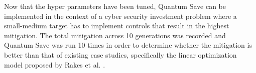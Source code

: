 \subsection*{\color{SubSectionBlue}{Cybersecurity Application}}
 \\

Now that the hyper parameters have been tuned, Quantum Save can be implemented in the context of a cyber security investment problem where a small-medium target has to implement controls that result in the highest mitigation. The total mitigation across 10 generations was recorded and Quantum Save was run 10 times in order to determine whether the mitigation is better than that of existing case studies, specifically the linear optimization model proposed by Rakes et al. \cite{rakes_it_2012}. 

\begin{singlespace}
\vspace*{0.6cm}
\begin{table}[H]
    \centering
    \caption{Quantum Save vs. Other Budget Allocation Models}
    \label{parametri}
\end{table}
\end{singlespace}
 \\

